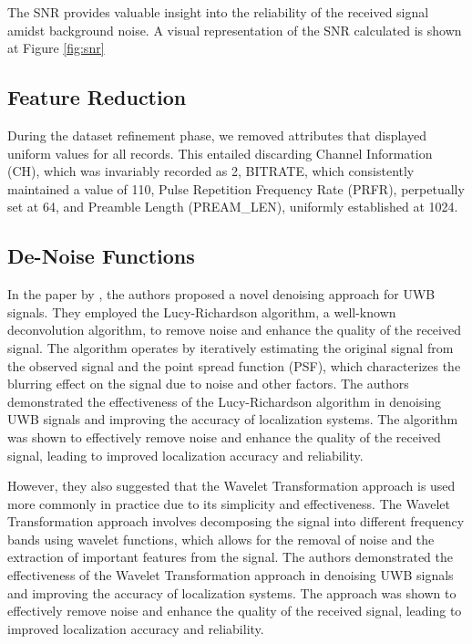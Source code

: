The SNR provides valuable insight into the reliability of the received signal amidst background noise. A visual representation of the SNR calculated is shown at Figure \ref{fig:snr}

\subsection{Feature Reduction}\label{feature_reduction}
During the dataset refinement phase, we removed attributes that displayed uniform values for all records. This entailed discarding Channel Information (CH), which was invariably recorded as 2, BITRATE, which consistently maintained a value of 110, Pulse Repetition Frequency Rate (PRFR), perpetually set at 64, and Preamble Length (PREAM\_LEN), uniformly established at 1024.

\subsection{De-Noise Functions}\label{de_noise_Functions}

In the paper by \cite{jiang_uwb_2020}, the authors proposed a novel denoising approach for UWB signals. They employed the Lucy-Richardson algorithm, a well-known deconvolution algorithm, to remove noise and enhance the quality of the received signal. The algorithm operates by iteratively estimating the original signal from the observed signal and the point spread function (PSF), which characterizes the blurring effect on the signal due to noise and other factors. The authors demonstrated the effectiveness of the Lucy-Richardson algorithm in denoising UWB signals and improving the accuracy of localization systems. The algorithm was shown to effectively remove noise and enhance the quality of the received signal, leading to improved localization accuracy and reliability.

However, they also suggested that the Wavelet Transformation approach is used more commonly in practice due to its simplicity and effectiveness. The Wavelet Transformation approach involves decomposing the signal into different frequency bands using wavelet functions, which allows for the removal of noise and the extraction of important features from the signal. The authors demonstrated the effectiveness of the Wavelet Transformation approach in denoising UWB signals and improving the accuracy of localization systems. The approach was shown to effectively remove noise and enhance the quality of the received signal, leading to improved localization accuracy and reliability.

